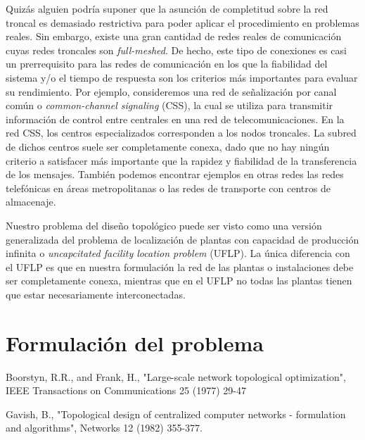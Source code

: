 \documentclass[twoside,12pt]{article}
\begin{document}
Quizás alguien podría suponer que la asunción de completitud sobre la red troncal es demasiado restrictiva para poder aplicar el procedimiento en problemas reales. Sin embargo, existe una gran cantidad de redes reales de comunicación cuyas redes troncales son \textit{full-meshed}. De hecho, este tipo de conexiones es casi un prerrequisito para las redes de comunicación en los que la fiabilidad del sistema y/o el tiempo de respuesta son los criterios más importantes para evaluar su rendimiento. Por ejemplo, consideremos una red de señalización por canal común o \textit{common-channel signaling} (CSS), la cual se utiliza para transmitir información de control entre centrales en una red de telecomunicaciones. En la red CSS, los centros especializados corresponden a los nodos troncales. La subred de dichos centros suele ser completamente conexa, dado que no hay ningún criterio a satisfacer más importante que la rapidez y fiabilidad de la transferencia de los mensajes. También podemos encontrar ejemplos en otras redes las redes telefónicas en áreas metropolitanas o las redes de transporte con centros de almacenaje. 

Nuestro problema del diseño topológico puede ser visto como una versión generalizada del problema de localización de plantas con capacidad de producción infinita o \textit{uncapcitated facility location problem} (UFLP). La única diferencia con el UFLP es que en nuestra formulación la red de las plantas o instalaciones debe ser completamente conexa, mientras que en el UFLP no todas las plantas tienen que estar necesariamente interconectadas.

\section{Formulación del problema}
\newpage
\begin{thebibliography}{9}
Boorstyn, R.R., and Frank, H., "Large-scale network
topological optimization", IEEE Transactions on Communications
25 (1977) 29-47

Gavish, B., "Topological design of centralized computer
networks - formulation and algorithms", Networks 12
(1982) 355-377. 


\end{thebibliography} 
\end{document}
